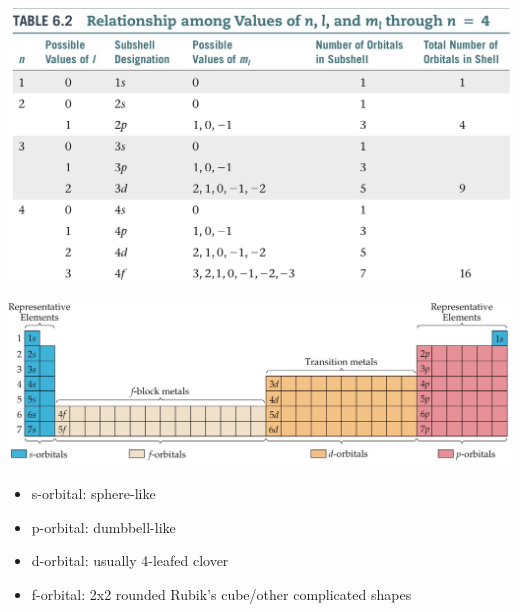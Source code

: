\begin{minipage}{0.60\columnwidth}
    \includegraphics[width = \linewidth]{images/Quantum_numbers_up_to_n_4.jpeg}
\end{minipage}
\begin{minipage}{0.37\columnwidth}
    \includegraphics[width = \linewidth]{images/PSE_Quantum_Numbers.jpeg}
    \begin{itemize}
        \item s-orbital: sphere-like
        \item p-orbital: dumbbell-like
        \item d-orbital: usually 4-leafed clover
        \item f-orbital: 2x2 rounded Rubik's cube/other complicated shapes 
    \end{itemize}
\end{minipage}

